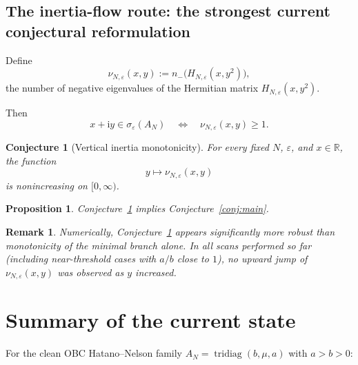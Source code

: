\documentclass[11pt]{article}
\newtheorem{proposition}[theorem]{Proposition}
\newtheorem{conjecture}[theorem]{Conjecture}
\newtheorem{remark}[theorem]{Remark}
\newcommand{\R}{\mathbb{R}}
\newcommand{\eps}{\varepsilon}
\newcommand{\sig}{\sigma}
\newcommand{\tridiag}{\operatorname{tridiag}}
\newcommand{\I}{\mathrm{i}}
\begin{document}
\subsection{The inertia-flow route: the strongest current conjectural reformulation}

Define
\[
\nu_{N,\eps}(x,y):=
n_-\!\bigl(H_{N,\eps}(x,y^2)\bigr),
\]
the number of negative eigenvalues of the Hermitian matrix \(H_{N,\eps}(x,y^2)\).

Then
\[
x+\I y\in \sig_\eps(A_N)
\quad\Longleftrightarrow\quad
\nu_{N,\eps}(x,y)\ge 1.
\]

\begin{conjecture}[Vertical inertia monotonicity]
\label{conj:inertia}
For every fixed \(N\), \(\eps\), and \(x\in\R\), the function
\[
y\longmapsto \nu_{N,\eps}(x,y)
\]
is nonincreasing on \([0,\infty)\).
\end{conjecture}

\begin{proposition}
Conjecture~\ref{conj:inertia} implies Conjecture~\ref{conj:main}.
\end{proposition}

\begin{remark}
Numerically, Conjecture~\ref{conj:inertia} appears significantly more robust than monotonicity of the minimal branch alone. In all scans performed so far (including near-threshold cases with \(a/b\) close to \(1\)), no upward jump of \(\nu_{N,\eps}(x,y)\) was observed as \(y\) increased.
\end{remark}

\section{Summary of the current state}

For the clean OBC Hatano--Nelson family \(A_N=\tridiag(b,\mu,a)\) with \(a>b>0\):
\end{document}
